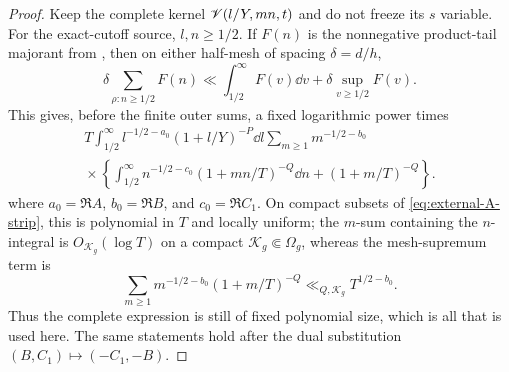 \begin{proof}
Keep the complete kernel $\mathscr V(l/Y,mn,t)$ and do not freeze its $s$ variable.
For the exact-cutoff source, $l,n\geq1/2$.  If $F(n)$ is the nonnegative
product-tail majorant from , then on either half-mesh
of spacing $\delta=d/h$,
\begin{equation}\label{eq:mesh-majorant}
 \delta\sum_{\rho:n\geq1/2}F(n)
 \ll\int_{1/2}^{\infty}F(v)\dd v
     +\delta\sup_{v\geq1/2}F(v).
\end{equation}
This gives, before the finite outer sums, a fixed logarithmic power times
\begin{multline}
 T\int_{1/2}^{\infty}l^{-1/2-a_0}(1+l/Y)^{-P}\dd l
 \sum_{m\geq1}m^{-1/2-b_0}\\
 {}\times\left\{
 \int_{1/2}^{\infty}n^{-1/2-c_0}(1+mn/T)^{-Q}\dd n
 +(1+m/T)^{-Q}\right\}.
 \label{eq:source-product-majorant}
\end{multline}
where $a_0=\Re A$, $b_0=\Re B$, and $c_0=\Re C_1$.  On compact subsets of
\eqref{eq:external-A-strip}, this is polynomial in $T$ and locally uniform;
the $m$-sum containing the $n$-integral is $O_{\mathscr K_g}(\log T)$ on a
compact $\mathscr K_g\Subset\Omega_g$, whereas the mesh-supremum term is
\begin{equation}\label{eq:mesh-supremum-m-sum}
 \sum_{m\geq1}m^{-1/2-b_0}(1+m/T)^{-Q}
 \ll_{Q,\mathscr K_g}T^{1/2-b_0}.
\end{equation}
Thus the complete expression is still of fixed polynomial size, which is
all that is used here.  The same statements hold after the dual substitution
$(B,C_1)\mapsto(-C_1,-B)$.


\end{proof}
